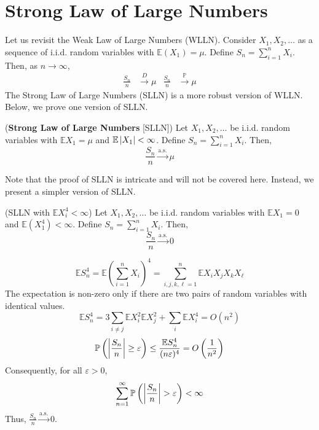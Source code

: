 \documentclass{huhtakm-template-book}
\newcommand{\prob}{\mathbb{P}}
\newcommand{\expect}{\mathbb{E}}
\begin{document}
\section{Strong Law of Large Numbers}
    Let us revisit the Weak Law of Large Numbers (WLLN). Consider $X_{1},X_{2},\dots$ as a sequence of i.i.d. random variables with $\expect(X_{1})=\mu$. Define $S_{n}=\sum_{i=1}^{n}X_{i}$. Then, as $n\to\infty$,
    \begin{align*}
        \frac{S_{n}}{n}&\xrightarrow{D}\mu & \frac{S_{n}}{n}&\xrightarrow{\prob}\mu
    \end{align*}
    The Strong Law of Large Numbers (SLLN) is a more robust version of WLLN. Below, we prove one version of SLLN.
    \begin{thm}(\textbf{Strong Law of Large Numbers} [SLLN])
        Let $X_{1},X_{2},\dots$ be i.i.d. random variables with $\expect X_{1}=\mu$ and $\expect\abs{X_{1}}<\infty$. Define $S_{n}=\sum_{i=1}^{n}X_{i}$. Then,
        \begin{equation*}
            \frac{S_{n}}{n}\xrightarrow{\text{a.s.}}\mu
        \end{equation*}
    \end{thm}
    Note that the proof of SLLN is intricate and will not be covered here. Instead, we present a simpler version of SLLN.
    \newpage
    \begin{thm}(SLLN with $\expect X_{i}^{4}<\infty$)
        Let $X_{1},X_{2},\dots$ be i.i.d. random variables with $\expect X_{1}=0$ and $\expect(X_{1}^{4})<\infty$. Define $S_{n}=\sum_{i=1}^{n}X_{i}$. Then,
        \begin{equation*}
            \frac{S_{n}}{n}\xrightarrow{\text{a.s.}}0
        \end{equation*}
    \end{thm}
    \begin{proofing}
        \begin{equation*}
            \expect S_{n}^{4}=\expect\left(\sum_{i=1}^{n}X_{i}\right)^{4}=\sum_{i,j,k,\ell=1}^{n}\expect X_{i}X_{j}X_{k}X_{\ell}
        \end{equation*}
        The expectation is non-zero only if there are two pairs of random variables with identical values.
        \begin{equation*}
            \expect S_{n}^{4}=3\sum_{i\neq j}\expect X_{i}^{2}\expect X_{j}^{2}+\sum_{i}\expect X_{i}^{4}=O(n^{2})
        \end{equation*}
        \begin{equation*}
            \prob\left(\abs{\frac{S_{n}}{n}}\geq\varepsilon\right)\leq\frac{\expect S_{n}^{4}}{(n\varepsilon)^{4}}=O\left(\frac{1}{n^{2}}\right)
        \end{equation*}
        Consequently, for all $\varepsilon>0$,
        \begin{equation*}
            \sum_{n=1}^{\infty}\prob\left(\abs{\frac{S_{n}}{n}}>\varepsilon\right)<\infty
        \end{equation*}
        Thus, $\frac{S_{n}}{n}\xrightarrow{\text{a.s.}}0$.
    \end{proofing}
\end{document}

